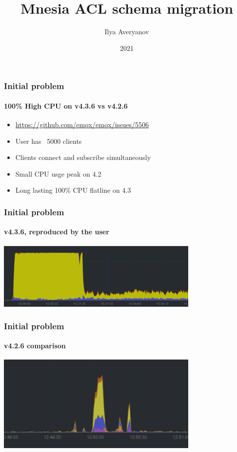 \documentclass{beamer}
\title{Mnesia ACL schema migration}
\author{Ilya Averyanov}
\institute{EMQX}
\date{2021}
\begin{document}
\frame{\titlepage}

\begin{frame}
    \frametitle{Initial problem}
    \framesubtitle{100\% High CPU on v4.3.6 vs v4.2.6}

    \begin{itemize}
        \item \href{https://github.com/emqx/emqx/issues/5506}{https://github.com/emqx/emqx/issues/5506}
        \item User has ~5000 clients
        \item Clients connect and subscribe simultaneously
        \item Small CPU usge peak on 4.2
        \item Long lasting 100\% CPU flatline on 4.3
    \end{itemize}
\end{frame}

\begin{frame}
    \frametitle{Initial problem}
    \framesubtitle{v4.3.6, reproduced by the user}

    \begin{center}
        \includegraphics[width=10cm, keepaspectratio]{images/initial-4.3.png}
    \end{center}
\end{frame}

\begin{frame}
    \frametitle{Initial problem}
    \framesubtitle{v4.2.6 comparison}

    \begin{center}
        \includegraphics[width=10cm, keepaspectratio]{images/initial-4.2.png}
    \end{center}
\end{frame}
\end{document}
